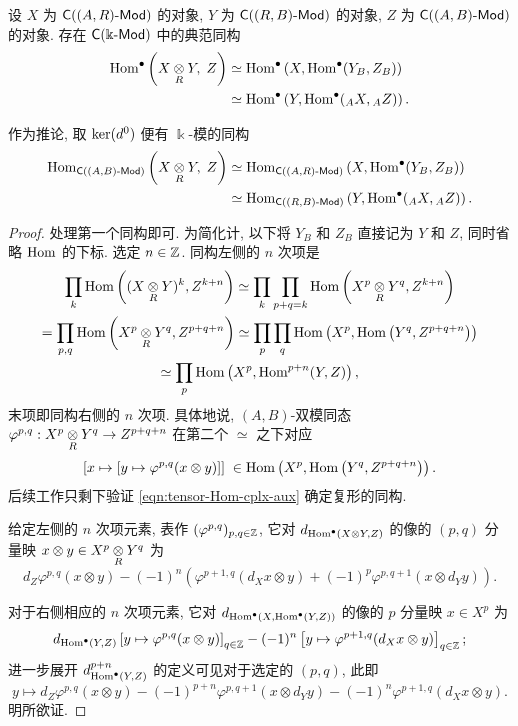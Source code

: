 \begin{proposition}\label{prop:tensor-Hom-cplx}
	设 $X$ 为 $\mathsf{C}((A, R)\text{-}\mathsf{Mod})$ 的对象, $Y$ 为 $\mathsf{C}((R, B)\text{-}\mathsf{Mod})$ 的对象, $Z$ 为 $\mathsf{C}((A, B)\text{-}\mathsf{Mod})$ 的对象. 存在 $\mathsf{C}(\Bbbk\text{-}\mathsf{Mod})$ 中的典范同构
	\begin{align*}
		\operatorname{Hom}^\bullet\left( X \underset{R}{\otimes} Y, \; Z \right) & \simeq \operatorname{Hom}^\bullet\left( X, \operatorname{Hom}^\bullet(Y_B, Z_B) \right) \\
		& \simeq \operatorname{Hom}^\bullet\left( Y, \operatorname{Hom}^\bullet({}_A X, {}_A Z) \right).
	\end{align*}

	作为推论, 取 $\operatorname{ker}(d^0)$ 便有 $\Bbbk$-模的同构
	\begin{align*}
		\operatorname{Hom}_{\mathsf{C}((A, B)\text{-}\mathsf{Mod})}\left( X \underset{R}{\otimes} Y, \; Z \right) & \simeq \operatorname{Hom}_{\mathsf{C}((A, R)\text{-}\mathsf{Mod})}\left( X, \operatorname{Hom}^\bullet(Y_B, Z_B) \right) \\
		& \simeq \operatorname{Hom}_{\mathsf{C}((R, B)\text{-}\mathsf{Mod})}\left( Y, \operatorname{Hom}^\bullet({}_A X, {}_A Z) \right).
	\end{align*}
\end{proposition}
\begin{proof}
	处理第一个同构即可. 为简化计, 以下将 $Y_B$ 和 $Z_B$ 直接记为 $Y$ 和 $Z$, 同时省略 $\operatorname{Hom}$ 的下标. 选定 $n \in \mathbb{Z}$. 同构左侧的 $n$ 次项是
	\begin{multline}\label{eqn:tensor-Hom-cplx-aux}
		\prod_k \operatorname{Hom}\left( (X \underset{R}{\otimes} Y)^k, Z^{k+n}\right) \simeq \prod_k \prod_{p+q=k} \operatorname{Hom}\left(X^p \underset{R}{\otimes} Y^q, Z^{k+n}\right) \\
		= \prod_{p, q} \operatorname{Hom}\left( X^p \underset{R}{\otimes} Y^q, Z^{p+q+n} \right) \simeq \prod_p \prod_q \operatorname{Hom}\left( X^p, \operatorname{Hom}\left(Y^q, Z^{p+q+n}\right) \right) \\
		\simeq \prod_p \operatorname{Hom}\left( X^p, \operatorname{Hom}^{p+n}(Y, Z) \right),
	\end{multline}
	末项即同构右侧的 $n$ 次项. 具体地说, $(A, B)$-双模同态 $\varphi^{p, q}: X^p \underset{R}{\otimes} Y^q \to Z^{p+q+n}$ 在第二个 $\simeq$ 之下对应
	\[ \left[ x \mapsto [y \mapsto \varphi^{p,q}(x \otimes y)] \right] \; \in \operatorname{Hom}\left( X^p, \operatorname{Hom}\left(Y^q, Z^{p+q+n}\right) \right). \]
	后续工作只剩下验证 \eqref{eqn:tensor-Hom-cplx-aux} 确定复形的同构.
	
	给定左侧的 $n$ 次项元素, 表作 $(\varphi^{p,q})_{p, q \in \mathbb{Z}}$, 它对 $d_{\operatorname{Hom}^\bullet(X \otimes Y, Z)}$ 的像的 $(p, q)$ 分量映 $x \otimes y \in X^p \underset{R}{\otimes} Y^q$ 为
	\[ d_Z \varphi^{p,q}(x \otimes y) - (-1)^n \left( \varphi^{p+1, q}(d_X x \otimes y) + (-1)^p \varphi^{p, q+1}(x \otimes d_Y y) \right). \]
	
	对于右侧相应的 $n$ 次项元素, 它对 $d_{\operatorname{Hom}^\bullet(X, \operatorname{Hom}^\bullet(Y, Z))}$ 的像的 $p$ 分量映 $x \in X^p$ 为
	\[
		d_{\operatorname{Hom}^\bullet(Y, Z)}\left[ y \mapsto \varphi^{p,q}(x \otimes y) \right]_{q \in \mathbb{Z}} - (-1)^n \left[ y \mapsto \varphi^{p+1, q}(d_X x \otimes y) \right]_{q \in \mathbb{Z}};
	\]
	进一步展开 $d^{p+n}_{\operatorname{Hom}^\bullet(Y, Z)}$ 的定义可见对于选定的 $(p, q)$, 此即
	\[ y \mapsto d_Z \varphi^{p,q}(x \otimes y) - (-1)^{p+n} \varphi^{p, q+1}(x \otimes d_Y y) - (-1)^n \varphi^{p+1, q}(d_X x \otimes y). \]
	明所欲证.
\end{proof}

